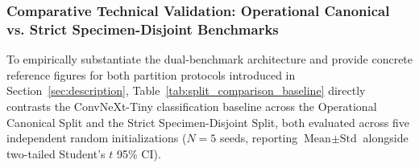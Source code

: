 \documentclass[a4paper,fleqn,12pt]{cas-sc}
\begin{document}
\subsubsection{Comparative Technical Validation: Operational Canonical vs. Strict Specimen-Disjoint Benchmarks}
\label{sec:comparative_validation}

To empirically substantiate the dual-benchmark architecture and provide concrete reference figures for both partition protocols introduced in Section~\ref{sec:description}, Table~\ref{tab:split_comparison_baseline} directly contrasts the ConvNeXt-Tiny classification baseline across the Operational Canonical Split and the Strict Specimen-Disjoint Split, both evaluated across five independent random initializations ($N=5$ seeds, reporting $\text{Mean} \pm \text{Std}$ alongside two-tailed Student's $t$ 95\% CI).
\end{document}
